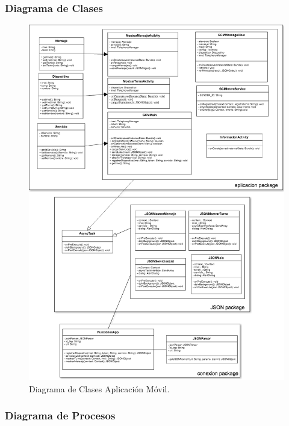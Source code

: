 \subsubsection{Diagrama de Clases}

\begin{figure}[H]
\centering
\includegraphics[scale=0.45]{images/capitulo4/diagramaClases.png}
\caption{Diagrama de Clases Aplicación Móvil.}
\label{diagramaClases}
\end{figure}

\subsubsection{Diagrama de Procesos}

